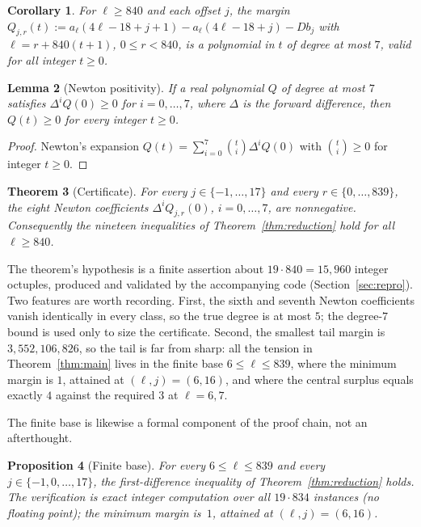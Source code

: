 \documentclass[11pt]{article}
\newtheorem{theorem}{Theorem}
\newtheorem{lemma}[theorem]{Lemma}
\newtheorem{corollary}[theorem]{Corollary}
\newtheorem{proposition}[theorem]{Proposition}
\theoremstyle{definition}
\begin{document}
\begin{corollary}\label{cor:poly}
For $\ell\ge840$ and each offset $j$, the margin
$Q_{j,r}(t):=a_\ell(4\ell-18+j+1)-a_\ell(4\ell-18+j)-Db_j$ with
$\ell=r+840(t+1)$, $0\le r<840$, is a polynomial in $t$ of degree at most $7$, valid for all
integer $t\ge0$.
\end{corollary}

\begin{lemma}[Newton positivity]\label{lem:newton}
If a real polynomial $Q$ of degree at most $7$ satisfies $\Delta^i Q(0)\ge0$ for $i=0,\dots,7$,
where $\Delta$ is the forward difference, then $Q(t)\ge0$ for every integer $t\ge0$.
\end{lemma}

\begin{proof}
Newton's expansion $Q(t)=\sum_{i=0}^{7}\binom{t}{i}\Delta^iQ(0)$ with $\binom{t}{i}\ge0$ for
integer $t\ge0$.
\end{proof}

\begin{theorem}[Certificate]\label{thm:certificate}
For every $j\in\{-1,\dots,17\}$ and every $r\in\{0,\dots,839\}$, the eight Newton coefficients
$\Delta^i Q_{j,r}(0)$, $i=0,\dots,7$, are nonnegative. Consequently the nineteen inequalities of
Theorem~\ref{thm:reduction} hold for all $\ell\ge840$.
\end{theorem}

The theorem's hypothesis is a finite assertion about $19\cdot840=15{,}960$ integer octuples,
produced and validated by the accompanying code (Section~\ref{sec:repro}). Two features are worth
recording. First, the sixth and seventh Newton coefficients vanish identically in every class, so
the true degree is at most $5$; the degree-$7$ bound is used only to size the certificate. Second,
the smallest tail margin is $3{,}552{,}106{,}826$, so the tail is far from sharp: all the tension in
Theorem~\ref{thm:main} lives in the finite base $6\le\ell\le839$, where the minimum margin is $1$,
attained at $(\ell,j)=(6,16)$, and where the central surplus equals exactly $4$ against the required
$3$ at $\ell=6,7$.

The finite base is likewise a formal component of the proof chain, not an afterthought.

\begin{proposition}[Finite base]\label{thm:finite}
For every $6\le\ell\le839$ and every $j\in\{-1,0,\dots,17\}$, the first-difference inequality of
Theorem~\ref{thm:reduction} holds. The verification is exact integer computation over all
$19\cdot834$ instances (no floating point); the minimum margin is~$1$, attained at
$(\ell,j)=(6,16)$.
\end{proposition}
\end{document}
